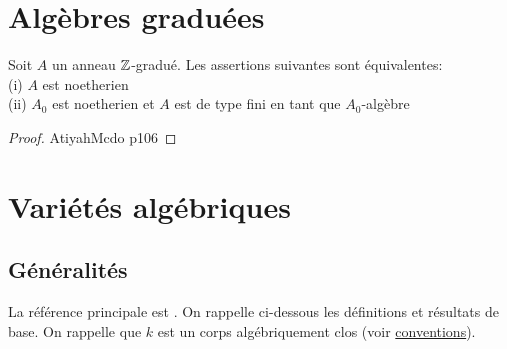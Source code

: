 \section{Algèbres graduées}

\begin{prop}\label{noethgrad}\label{interhauteurun}
Soit $A$ un anneau $\mathbb{Z}$-gradué. Les assertions suivantes sont équivalentes:\\
(i) $A$ est noetherien\\
(ii) $A_0$ est noetherien et $A$ est de type fini en tant que $A_0$-algèbre
\end{prop}
\begin{proof}
AtiyahMcdo p106
\end{proof}


\section{Variétés algébriques}

\subsection{Généralités}
La référence principale est \cite{LAGSpringer}. On rappelle ci-dessous les définitions et résultats de base. On rappelle que $k$ est un corps algébriquement clos (voir \hyperref[sec:conventions]{conventions}).
